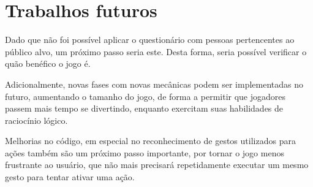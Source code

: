 \section{Trabalhos futuros}\label{sec-conc-trabalhos-futuros}

Dado que não foi possível aplicar o questionário com pessoas pertencentes ao 
público alvo, um próximo passo seria este. Desta forma, seria possível verificar 
o quão benéfico o jogo é.

Adicionalmente, novas fases com novas mecânicas podem ser implementadas no 
futuro, aumentando o tamanho do jogo, de forma a permitir que jogadores 
passem mais tempo se divertindo, enquanto exercitam suas habilidades de 
raciocínio lógico.

Melhorias no código, em especial no reconhecimento de gestos utilizados 
para ações também são um próximo passo importante, por tornar o jogo 
menos frustrante ao usuário, que não mais precisará repetidamente executar 
um mesmo gesto para tentar ativar uma ação.